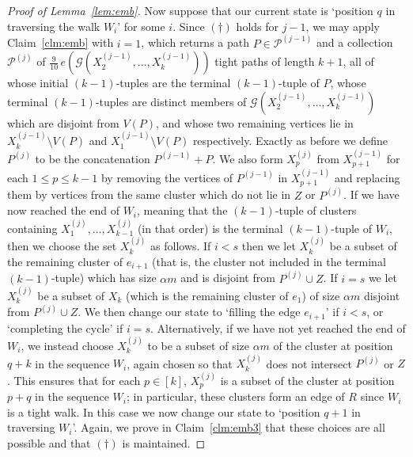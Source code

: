 \documentclass[12pt,a4paper]{amsart}
\newcommand{\cG}{\mathcal{G}}
\newcommand{\paths}{\mathscr{P}}
\begin{document}
\begin{proof}[Proof of Lemma~\ref{lem:emb}]
Now suppose that our current state is `position $q$ in traversing the walk $W_i$' for some $i$. Since $(\dagger)$ holds for $j-1$, 
we may apply Claim~\ref{clm:emb} with $i=1$,
which returns a path $P\in\paths^{(j-1)}$ and a collection $\paths^{(j)}$ of
 $\tfrac{9}{10}\,e(\cG(X^{(j-1)}_{2},\ldots,X^{(j-1)}_{k}))$ tight paths of length $k+1$, all of whose initial $(k-1)$-tuples are the terminal $(k-1)$-tuple of $P$,
 whose terminal $(k-1)$-tuples are distinct members of
 $\cG(X^{(j-1)}_{2},\ldots,X^{(j-1)}_{k})$ which are disjoint from $V(P)$, and whose two remaining vertices lie in $X^{(j-1)}_k \setminus V(P)$ and $X^{(j-1)}_1 \setminus V(P)$ respectively.  Exactly as before we define $P^{(j)}$ to be the concatenation $P^{(j-1)} + P$. We also form $X^{(j)}_p$ from $X^{(j-1)}_{p+1}$ for each $1\le p\le k-1$ by removing the vertices of $P^{(j-1)}$ in $X_{p+1}^{(j-1)}$ and replacing them by vertices from the same cluster which do not lie in $Z$ or $P^{(j)}$. 
If we have now reached the end of $W_i$, meaning that the $(k-1)$-tuple of clusters containing $X^{(j)}_1, \dots, X^{(j)}_{k-1}$ (in that order) is the terminal $(k-1)$-tuple of $W_i$, then we choose the set $X^{(j)}_k$ as follows. If $i < s$ then we let $X^{(j)}_k$ be a subset of the remaining cluster of $e_{i+1}$ (that is, the cluster not included in the terminal $(k-1)$-tuple) which has size $\alpha m$ and is disjoint from $P^{(j)}\cup Z$. If $i=s$ we let $X^{(j)}_k$ be a subset of $X_k$ (which is the remaining cluster of $e_1$) of size $\alpha m$ disjoint from $P^{(j)}\cup Z$. We then change our state to `filling the edge $e_{i+1}$' if $i < s$, or `completing the cycle' if $i = s$. Alternatively, if we have not yet reached the end of $W_i$, we instead choose  $X^{(j)}_k$ to be a subset of size $\alpha m$ of the cluster at position $q+k$ in the sequence $W_i$, again chosen so that $X^{(j)}_k$ does not intersect $P^{(j)}$ or $Z$. This ensures that for each $p \in [k]$, $X^{(j)}_p$ is a subset of the cluster at position $p + q$ in the sequence $W_i$; in particular, these clusters form an edge of $R$ since $W_i$ is a tight walk. In this case we now change our state to `position $q+1$ in traversing
 $W_i$'. Again, we prove in Claim~\ref{clm:emb3} that these choices are all possible and that $(\dagger)$ is maintained.


\end{proof}
\end{document}
